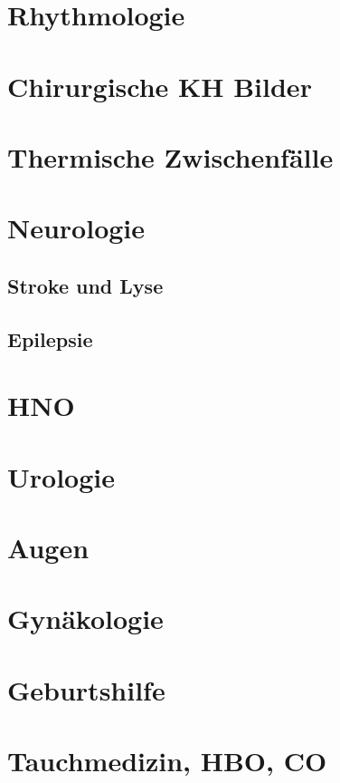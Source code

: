 \clearpage
\section{Rhythmologie} 

\clearpage
\section{Chirurgische KH Bilder}

\clearpage
\section{Thermische Zwischenfälle}

\clearpage
\section{Neurologie}
\subsection{Stroke und Lyse}
\subsection{Epilepsie}

\clearpage
\section{HNO}

\clearpage
\section{Urologie}

\clearpage
\section{Augen}

\clearpage
\section{Gynäkologie}

\clearpage
\section{Geburtshilfe}

\clearpage
\section{Tauchmedizin, HBO, CO}

